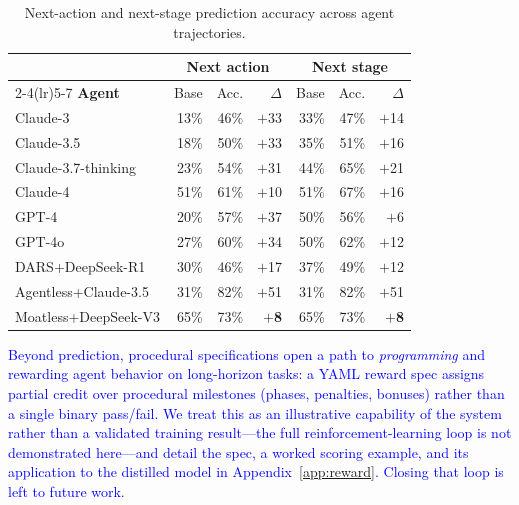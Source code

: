 \documentclass[11pt]{article}
\begin{document}
\begin{table}[htbp!]
\centering\small\setlength{\tabcolsep}{4pt}
  \begin{tabular}{lrrrrrr}
  \toprule
  & \multicolumn{3}{c}{\textbf{Next action}}
  & \multicolumn{3}{c}{\textbf{Next stage}} \\
  \cmidrule(lr){2-4}\cmidrule(lr){5-7}
  \textbf{Agent} & Base & Acc. & $\Delta$ & Base & Acc. & $\Delta$ \\
  \midrule
  \rowcolor{claudebg}
  Claude-3              & 13\% & 46\% & $+$33 & 33\% & 47\% & $+$14 \\
  \rowcolor{claudebg}
  Claude-3.5            & 18\% & 50\% & $+$33 & 35\% & 51\% & $+$16 \\
  \rowcolor{claudebg}
  Claude-3.7-thinking   & 23\% & 54\% & $+$31 & 44\% & 65\% & $+$21 \\
  \rowcolor{claudebg}
  Claude-4              & 51\% & 61\% & $+$10 & 51\% & 67\% & $+$16 \\
  \midrule
  \rowcolor{gptbg}
  GPT-4                 & 20\% & 57\% & $+$37 & 50\% & 56\% & $+$6  \\
  \rowcolor{gptbg}
  GPT-4o                & 27\% & 60\% & $+$34 & 50\% & 62\% & $+$12 \\
  \midrule
  \rowcolor{owbg}
  DARS+DeepSeek-R1      & 30\% & 46\% & $+$17 & 37\% & 49\% & $+$12 \\
  \rowcolor{owbg}
  Agentless+Claude-3.5  & 31\% & 82\% & $+$51 & 31\% & 82\% & $+$51 \\
  \rowcolor{owbg}
  Moatless+DeepSeek-V3  & 65\% & 73\% & \textbf{$+$8}
                        & 65\% & 73\% & \textbf{$+$8} \\
  \bottomrule
  \end{tabular}
  \caption{Next-action and next-stage prediction accuracy across agent trajectories.}
  \label{tab:trajectory_holdouts}
  \end{table}

\textcolor{blue}{Beyond prediction, procedural specifications open a path to \emph{programming} and rewarding agent behavior on long-horizon tasks: a YAML reward spec assigns partial credit over procedural milestones (phases, penalties, bonuses) rather than a single binary pass/fail. We treat this as an illustrative capability of the system rather than a validated training result---the full reinforcement-learning loop is not demonstrated here---and detail the spec, a worked scoring example, and its application to the distilled model in Appendix~\ref{app:reward}. Closing that loop is left to future work.}
\end{document}

